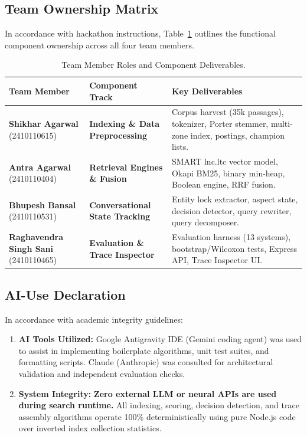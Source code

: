\documentclass[10pt,a4paper,twocolumn]{article}
\begin{document}
\subsection{Team Ownership Matrix}
In accordance with hackathon instructions, Table~\ref{tab:work_division} outlines the functional component ownership across all four team members.

\begin{table}[H]
\centering
\scriptsize
\caption{Team Member Roles and Component Deliverables.}
\label{tab:work_division}
\begin{tabularx}{\columnwidth}{p{2.3cm} p{2.2cm} X}
\toprule
\textbf{Team Member} & \textbf{Component Track} & \textbf{Key Deliverables} \\
\midrule
\textbf{Shikhar Agarwal} \newline (2410110615) & \textbf{Indexing \& Data Preprocessing} & Corpus harvest (35k passages), tokenizer, Porter stemmer, multi-zone index, postings, champion lists. \\
\midrule
\textbf{Antra Agarwal} \newline (2410110404) & \textbf{Retrieval Engines \& Fusion} & SMART $\text{lnc.ltc}$ vector model, Okapi BM25, binary min-heap, Boolean engine, RRF fusion. \\
\midrule
\textbf{Bhupesh Bansal} \newline (2410110531) & \textbf{Conversational State Tracking} & Entity lock extractor, aspect state, decision detector, query rewriter, query decomposer. \\
\midrule
\textbf{Raghavendra Singh Sani} \newline (2410110465) & \textbf{Evaluation \& Trace Inspector} & Evaluation harness (13 systems), bootstrap/Wilcoxon tests, Express API, Trace Inspector UI. \\
\bottomrule
\end{tabularx}
\end{table}

\subsection{AI-Use Declaration}
In accordance with academic integrity guidelines:
\begin{enumerate}
    \item \textbf{AI Tools Utilized:} Google Antigravity IDE (Gemini coding agent) was used to assist in implementing boilerplate algorithms, unit test suites, and formatting scripts. Claude (Anthropic) was consulted for architectural validation and independent evaluation checks.
    \item \textbf{System Integrity:} \textbf{Zero external LLM or neural APIs are used during search runtime.} All indexing, scoring, decision detection, and trace assembly algorithms operate 100\% deterministically using pure Node.js code over inverted index collection statistics.
\end{enumerate}
\end{document}

